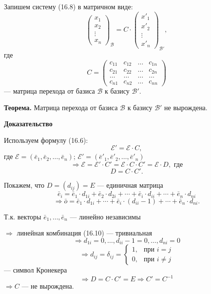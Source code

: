 \documentclass[12pt,a4paper]{article}
\newcommand{\ve}{\bar e}
\newcommand{\vo}{\bar o}
\begin{document}
Запишем систему (16.8) в матричном виде:
\begin{equation}
\begin{pmatrix} x_1 \\ x_2 \\ \vdots \\ x_n
\end{pmatrix}_{\mathcal{B}} = C \cdot
\begin{pmatrix} x'_1 \\ x'_2 \\ \vdots \\ x'_n
\end{pmatrix}_{\mathcal{B}'}, \tag{16.9}
\end{equation}
где
$$
C =
\begin{pmatrix} c_{11} & c_{12} & \ldots & c_{1n} \\ c_{21} & c_{22}
& \ldots & c_{2n} \\ \ldots & \ldots & \ldots & \ldots \\ c_{n1} &
c_{n2} & \ldots & c_{nn}
\end{pmatrix}
$$
--- матрица перехода от базиса $\mathcal{B}$ к базису $\mathcal{B}'$.

\textbf{Теорема.} Матрица перехода от базиса $\mathcal{B}$ к базису
$\mathcal{B}'$ не вырождена.

\textbf{Доказательство}

Используем формулу (16.6):
$$
\mathcal{E}' = \mathcal{E} \cdot C,
$$
где $\mathcal{E} = (\ve_1, \ve_2, \ldots, \ve_n)$; $\mathcal{E}' =
(\ve'_1, \ve'_2, \ldots, \ve'_n)$
$$
\Rightarrow \mathcal{E} = \mathcal{E}' \cdot C' = \mathcal{E} \cdot C
\cdot C' = \mathcal{E} \cdot D, \text{ где}
$$
$$
D = C \cdot C'.
$$

Покажем, что $D = (d_{ij}) = E$ --- единичная матрица
$$
\ve_i = \ve_1 \cdot d_{1i} + \ve_2 \cdot d_{2i} + \cdots + \ve_i
\cdot d_{ii} + \cdots + \ve_n \cdot d_{ni}
$$
\begin{equation}
\Rightarrow \vo = \ve_1 \cdot d_{1i} + \cdots + \ve_i \cdot (d_{ii} -
1) + \cdots + \ve_n \cdot d_{ni}. \tag{16.10}
\end{equation}

Т.к. векторы $\ve_1, \ldots, \ve_n$ --- линейно независимы

$\Rightarrow$ линейная комбинация (16.10) --- тривиальная
$$
\Rightarrow d_{1i} = 0, \ldots, d_{ii} - 1 = 0, \ldots, d_{ni} = 0
$$
$$
\Rightarrow d_{ij} = \delta_{ij} =
\begin{cases} 1, & \text{при } i = j \\ 0, & \text{при } i \ne j
\end{cases}
$$
--- символ Кронекера
$$
\Rightarrow D = C \cdot C' = E \Rightarrow C' = C^{-1}
$$
$\Rightarrow C$ --- не вырождена.
\end{document}

